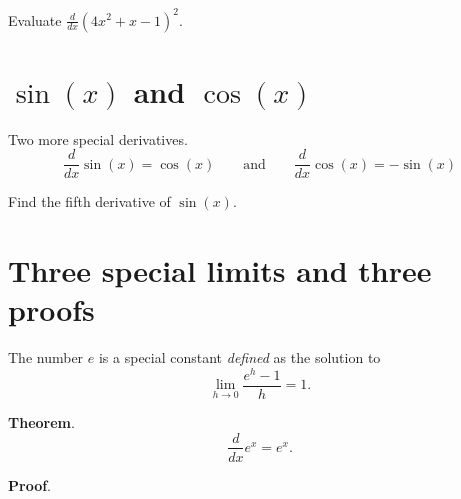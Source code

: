 \documentclass[../main.tex]{subfiles}
\begin{document}
\begin{example}
  Evaluate \(\frac{d}{dx} (4x^{2} + x - 1)^{2}\).
\end{example}
\vfill
\clearpage

\section{\texorpdfstring{\(\sin(x)\) and \(\cos(x)\)}{sin(x) and cos(x)}}
\begin{mdframed}[style=simple]
  Two more special derivatives.
  \[
    \frac{d}{dx} \sin(x) = \cos(x)
    \qquad
    \text{and}
    \qquad
    \frac{d}{dx} \cos(x) = -\sin(x)
  \]
\end{mdframed}
\bigskip

\begin{example}
  Find the fifth derivative of \(\sin(x)\).
\end{example}
\clearpage

\section{Three special limits and three proofs}
The number \(e\) is a special constant \emph{defined} as the solution to
\begin{equation} \label{eq:limit-exp}
  \lim_{h \to 0} \frac{e^{h} - 1}{h} = 1.
\end{equation}

\medskip
\begin{figure}[h!]  %
  \centering
\end{figure}

\textbf{Theorem}. 
\[
  \frac{d}{dx} e^{x} = e^{x}.
\]

\bigskip
\textbf{Proof}. 

\vfill
\end{document}
